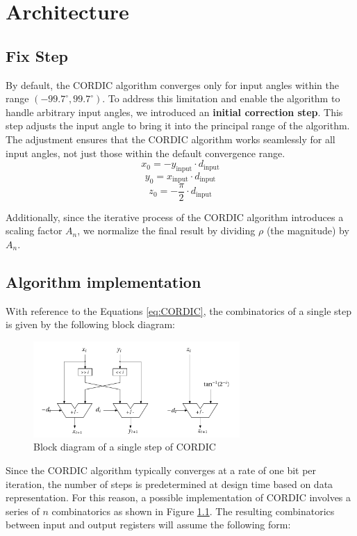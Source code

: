 \chapter{Architecture}
\section{Fix Step}
By default, the CORDIC algorithm converges only for input angles within the range \( (-99.7^\circ, 99.7^\circ) \).
To address this limitation and enable the algorithm to handle arbitrary input angles, we introduced an \textbf{initial correction step}. This step adjusts the input angle to bring it into the principal range of the algorithm. The adjustment ensures that the CORDIC algorithm works seamlessly for all input angles, not just those within the default convergence range.
\[
    x_0 = -y_{\text{input}} \cdot d_{\text{input}}
\]
\[
    y_0 =  x_{\text{input}} \cdot d_{\text{input}}
\]
\[
    z_0 = -\frac{\pi}{2} \cdot d_{\text{input}}
\]

Additionally, since the iterative process of the CORDIC algorithm introduces a scaling factor \( A_n \), we normalize the final result by dividing \( \rho \) (the magnitude) by \( A_n \).

\section{Algorithm implementation}
\label{sec:algorithm_implementation}

With reference to the Equations \ref{eq:CORDIC}, the combinatorics of a single step is given by the following block diagram:

\begin{figure}[H]
    \centering
    \includegraphics[width=0.7\textwidth]{images/Architecture/basic_CORDIC.pdf}
    \caption{Block diagram of a single step of CORDIC}
    \label{fig:basic_CORDIC}
\end{figure}

Since the CORDIC algorithm typically converges at a rate of one bit per iteration, the number of steps is predetermined at design time based on data representation. For this reason, a possible implementation of CORDIC involves a series of \( n \) combinatorics as shown in Figure \ref{fig:basic_CORDIC}. The resulting combinatorics between input and output registers will assume the following form:

